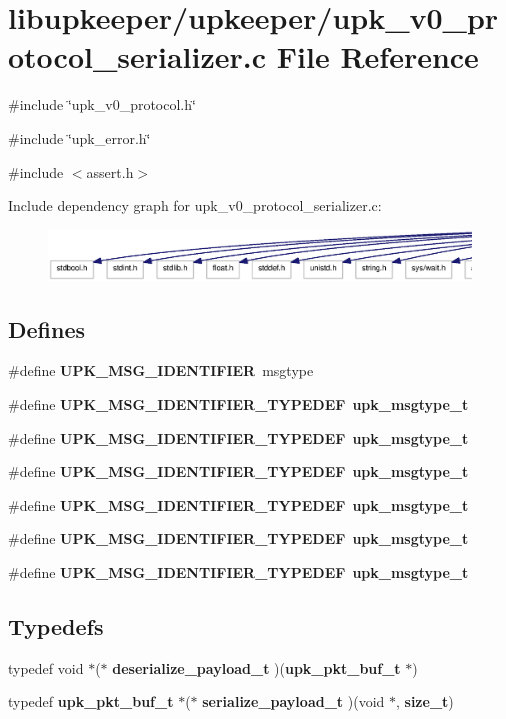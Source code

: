 \section{libupkeeper/upkeeper/upk\_\-v0\_\-protocol\_\-serializer.c File Reference}
\label{upk__v0__protocol__serializer_8c}
{\ttfamily \#include \char`\"{}upk\_\-v0\_\-protocol.h\char`\"{}}\par
{\ttfamily \#include \char`\"{}upk\_\-error.h\char`\"{}}\par
{\ttfamily \#include $<$assert.h$>$}\par
Include dependency graph for upk\_\-v0\_\-protocol\_\-serializer.c:\nopagebreak
\begin{figure}[H]
\begin{center}
\leavevmode
\includegraphics[width=400pt]{upk__v0__protocol__serializer_8c__incl}
\end{center}
\end{figure}
\subsection*{Defines}
\begin{DoxyCompactItemize}
\item 
\#define {\bf UPK\_\-MSG\_\-IDENTIFIER}~msgtype
\item 
\#define {\bf UPK\_\-MSG\_\-IDENTIFIER\_\-TYPEDEF}~{\bf upk\_\-msgtype\_\-t}
\item 
\#define {\bf UPK\_\-MSG\_\-IDENTIFIER\_\-TYPEDEF}~{\bf upk\_\-msgtype\_\-t}
\item 
\#define {\bf UPK\_\-MSG\_\-IDENTIFIER\_\-TYPEDEF}~{\bf upk\_\-msgtype\_\-t}
\item 
\#define {\bf UPK\_\-MSG\_\-IDENTIFIER\_\-TYPEDEF}~{\bf upk\_\-msgtype\_\-t}
\item 
\#define {\bf UPK\_\-MSG\_\-IDENTIFIER\_\-TYPEDEF}~{\bf upk\_\-msgtype\_\-t}
\item 
\#define {\bf UPK\_\-MSG\_\-IDENTIFIER\_\-TYPEDEF}~{\bf upk\_\-msgtype\_\-t}
\end{DoxyCompactItemize}
\subsection*{Typedefs}
\begin{DoxyCompactItemize}
\item 
typedef void $\ast$($\ast$ {\bf deserialize\_\-payload\_\-t} )({\bf upk\_\-pkt\_\-buf\_\-t} $\ast$)
\item 
typedef {\bf upk\_\-pkt\_\-buf\_\-t} $\ast$($\ast$ {\bf serialize\_\-payload\_\-t} )(void $\ast$, {\bf size\_\-t})
\end{DoxyCompactItemize}

